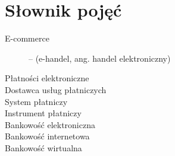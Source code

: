 \section*{Słownik pojęć}

\begin{description}
	\item[E-commerce] -- (e-handel, ang. handel elektroniczny) 
	\item[Płatności elektroniczne]
	\item[Dostawca usług płatniczych]
	\item[System płatniczy]
	\item[Instrument płatniczy]
	\item[Bankowość elektroniczna]
	\item[Bankowość internetowa]
	\item[Bankowość wirtualna]
\end{description}